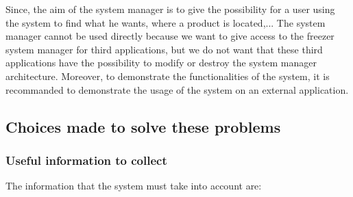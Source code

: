 Since, the aim of the system manager is to give the possibility for a user using the system to find what he wants, where a product is located,... The system manager cannot be used directly because we want to give access to the freezer system manager for third applications, but we do not want that these third applications have the possibility to modify or destroy the system manager architecture. Moreover, to demonstrate the functionalities of the system, it is recommanded to demonstrate the usage of the system on an external application.\\

\subsection{Choices made to solve these problems}
\subsubsection{Useful information to collect}
The information that the system must take into account are:

